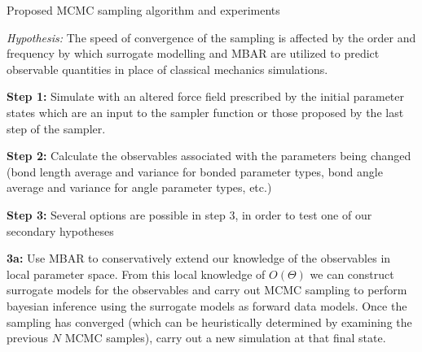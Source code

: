 \documentclass{report}
\begin{document}
\begin{outline}
\begin{outline}
\begin{outline}
\begin{outline}
\begin{outline}
{%
      \end{outline}
      \item{Proposed MCMC sampling algorithm and experiments}
      \begin{outline}
        \item{\textit{Hypothesis:} The speed of convergence of the sampling is affected by the order and frequency by which surrogate modelling and MBAR are utilized to predict observable quantities in place of 
                                   classical mechanics simulations.}
        \begin{outline}
          \item{\textbf{Step 1:} Simulate with an altered force field prescribed by the initial parameter states which are an input to the sampler function or
                those proposed by the last step of the sampler.}
          \item{\textbf{Step 2:} Calculate the observables associated with the parameters being changed (bond length average and variance for bonded parameter
                types, bond angle average and variance for angle parameter types, etc.)}
          \item{\textbf{Step 3:} Several options are possible in step 3, in order to test one of our secondary hypotheses}
          \begin{outline}
            \item{\textbf{3a:} Use MBAR to conservatively extend our knowledge of the observables in local parameter space. From this local knowledge of $O\left(\Theta\right)$ we can construct
                  surrogate models for the observables and carry out MCMC sampling to perform bayesian inference using the surrogate models as forward data models. Once the sampling has converged (which can be
                  heuristically determined by examining the previous $N$ MCMC samples), carry out a new simulation at that final state.}

\end{outline}
\end{outline}
\end{outline}
\end{outline}
\end{outline}
\end{outline}
\end{outline}
\end{document}
